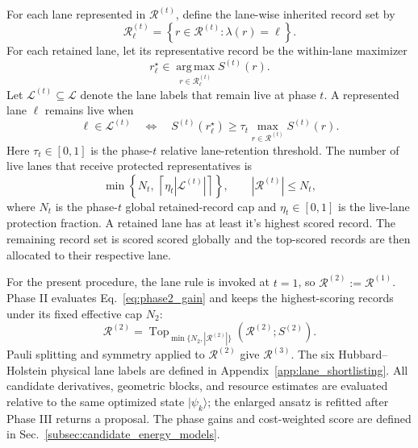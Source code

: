 \documentclass[
  reprint,
  amsmath,
  amssymb,
  aps,
  pra,
  nofootinbib,
  superscriptaddress,
  floatfix
]{revtex4-2}
\newcommand{\ket}[1]{|#1\rangle}
\begin{document}
For each lane represented in \(\mathcal R^{(t)}\), define the lane-wise inherited
record set by
\begin{equation*}
\mathcal R_{\ell}^{(t)}
=
\left\{
r\in\mathcal R^{(t)}
:
\lambda(r)=\ell
\right\}.
\end{equation*}
For each retained lane, let its representative record be the within-lane
maximizer
\[
r_{\ell}^{\star}
\in
\operatorname*{arg\,max}_{r\in\mathcal R_{\ell}^{(t)}}
S^{(t)}(r).
\]
Let \(\mathcal L^{(t)}\subseteq\mathcal L\) denote the lane labels that remain
live at phase \(t\). A represented lane \(\ell\) remains live when
\begin{equation}
\ell\in\mathcal L^{(t)}
\quad\Longleftrightarrow\quad
S^{(t)}(r_{\ell}^{\star})
\ge
\tau_t
\max_{r\in\mathcal R^{(t)}}S^{(t)}(r).
\label{eq:phase_restriction_map}
\end{equation}
Here \(\tau_t\in[0,1]\) is the phase-\(t\) relative lane-retention threshold.
The number of live lanes that receive protected representatives is
\begin{equation}
\min\left\{
N_t,\,
\left\lceil \eta_t|\mathcal L^{(t)}|\right\rceil
\right\},
\qquad
|\mathcal R^{(t)}|\le N_t ,
\label{eq:phase_lane_budget}
\end{equation}
where \(N_t\) is the phase-\(t\) global retained-record cap and
\(\eta_t\in[0,1] \) is the live-lane protection fraction. A retained lane has at least it's highest scored record. The remaining record set is scored scored globally and the top-scored records are then allocated to their respective lane.

For the present procedure, the lane rule is invoked at \(t=1\), so
\(\mathcal R^{(2)}:=\mathcal R^{(1)}\). Phase II evaluates
Eq.~\eqref{eq:phase2_gain} and keeps the highest-scoring records under its
fixed effective cap \(N_2\):
\begin{equation*}
\mathcal R^{(2)}
=\operatorname{Top}_{\min\{N_2,|\mathcal R^{(2)}|\}}
\left(\mathcal R^{(2)};S^{(2)}\right).
\end{equation*}
Pauli splitting and symmetry applied to \(\mathcal R^{(2)}\) give
\(\mathcal R^{(3)}\). The six
Hubbard--Holstein physical lane labels are defined in
Appendix~\ref{app:lane_shortlisting}. All candidate derivatives, geometric
blocks, and resource estimates are evaluated relative to the same optimized
state \(\ket{\psi_k}\); the enlarged ansatz is refitted after Phase III
returns a proposal. The phase gains and cost-weighted score are defined in
Sec.~\ref{subsec:candidate_energy_models}.
\end{document}
